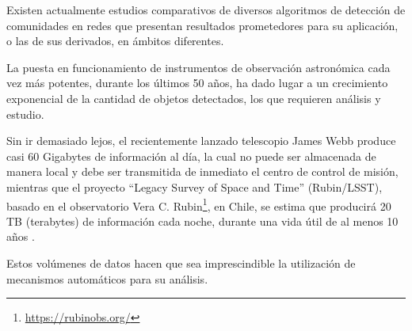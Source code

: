\documentclass[
	11pt,oneside,a4paper
]{article}
\begin{document}

Existen actualmente estudios comparativos de diversos algoritmos de detección de comunidades en redes \parencite{PhysRevE.80.056117} que presentan resultados prometedores para su aplicación, o las de sus derivados, en ámbitos diferentes.%


La puesta en funcionamiento de instrumentos de observación astronómica cada vez más potentes, durante los últimos 50 años, ha dado lugar a un crecimiento exponencial de la cantidad de objetos detectados, los que requieren análisis y estudio. 

Sin ir demasiado lejos, el recientemente lanzado telescopio James Webb produce casi 60 Gigabytes de información al día, la cual no puede ser almacenada de manera local y debe ser transmitida de inmediato el centro de control de misión\parencite{webdata}, mientras que el proyecto ``Legacy Survey of Space and Time'' (Rubin/LSST), basado en el observatorio Vera C. Rubin\footnote{\url{https://rubinobs.org/}}, en Chile, se estima que producirá 20 TB (terabytes) de información cada noche, durante una vida útil de al menos 10 años \parencite{Telescope2021Jul}.

Estos volúmenes de datos hacen que sea imprescindible la utilización de mecanismos automáticos para su análisis. %



\end{document}
